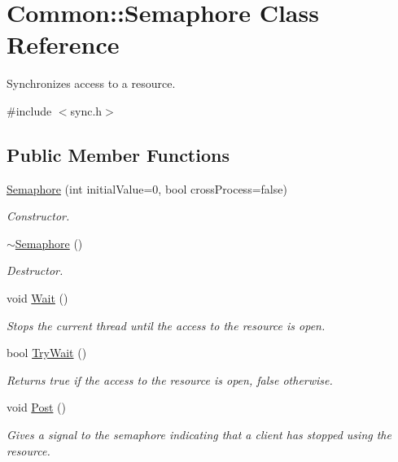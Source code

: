 \hypertarget{class_common_1_1_semaphore}{\section{Common\-:\-:Semaphore Class Reference}
\label{class_common_1_1_semaphore}
}


Synchronizes access to a resource.  




{\ttfamily \#include $<$sync.\-h$>$}

\subsection*{Public Member Functions}
\begin{DoxyCompactItemize}
\item 
\hyperlink{class_common_1_1_semaphore_af69fece31d41c390cb08d9c4abe0a67f}{Semaphore} (int initial\-Value=0, bool cross\-Process=false)
\begin{DoxyCompactList}\small\item\em Constructor. \end{DoxyCompactList}\item 
\hypertarget{class_common_1_1_semaphore_a4c9eebd8d0a6308f88da72faff8d7185}{\hyperlink{class_common_1_1_semaphore_a4c9eebd8d0a6308f88da72faff8d7185}{$\sim$\-Semaphore} ()}\label{class_common_1_1_semaphore_a4c9eebd8d0a6308f88da72faff8d7185}

\begin{DoxyCompactList}\small\item\em Destructor. \end{DoxyCompactList}\item 
void \hyperlink{class_common_1_1_semaphore_a72aabebf026e3a8b1f3e4d0fa8ee1eda}{Wait} ()
\begin{DoxyCompactList}\small\item\em Stops the current thread until the access to the resource is open. \end{DoxyCompactList}\item 
bool \hyperlink{class_common_1_1_semaphore_a2965d5aaefb8b178c525a6e9df36dd60}{Try\-Wait} ()
\begin{DoxyCompactList}\small\item\em Returns true if the access to the resource is open, false otherwise. \end{DoxyCompactList}\item 
void \hyperlink{class_common_1_1_semaphore_a1992c8b46527c96756ba6d9a1c754715}{Post} ()
\begin{DoxyCompactList}\small\item\em Gives a signal to the semaphore indicating that a client has stopped using the resource. \end{DoxyCompactList}\end{DoxyCompactItemize}
